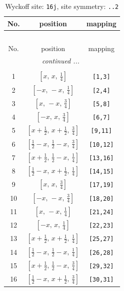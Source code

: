 \documentclass[fleqn,8pt]{jsarticle}
\begin{document}
\renewcommand{\arraystretch}{1.2}
\begin{longtable}{ccc}
\caption{Wyckoff site: {\tt 16j}, site symmetry: {\tt ..2}}
 \\
 \hline \hline
No. & position & mapping \\ \hline \endfirsthead

\multicolumn{2}{l}{\tablename\ \thetable{}} \\
 \hline \hline
No. & position & mapping \\ \hline \endhead

 \hline \hline
\multicolumn{2}{r}{\footnotesize\it continued ...} \\ \endfoot

 \hline \hline
\multicolumn{2}{r}{} \\ \endlastfoot

1 & $\left[ x,\, x,\, \frac{1}{4} \right]$ & {\tt [1,3]} \\ \hline
2 & $\left[ - x,\, - x,\, \frac{1}{4} \right]$ & {\tt [2,4]} \\ \hline
3 & $\left[ x,\, - x,\, \frac{3}{4} \right]$ & {\tt [5,8]} \\ \hline
4 & $\left[ - x,\, x,\, \frac{3}{4} \right]$ & {\tt [6,7]} \\ \hline
5 & $\left[ x + \frac{1}{2},\, x + \frac{1}{2},\, \frac{3}{4} \right]$ & {\tt [9,11]} \\ \hline
6 & $\left[ \frac{1}{2} - x,\, \frac{1}{2} - x,\, \frac{3}{4} \right]$ & {\tt [10,12]} \\ \hline
7 & $\left[ x + \frac{1}{2},\, \frac{1}{2} - x,\, \frac{1}{4} \right]$ & {\tt [13,16]} \\ \hline
8 & $\left[ \frac{1}{2} - x,\, x + \frac{1}{2},\, \frac{1}{4} \right]$ & {\tt [14,15]} \\ \hline
9 & $\left[ x,\, x,\, \frac{3}{4} \right]$ & {\tt [17,19]} \\ \hline
10 & $\left[ - x,\, - x,\, \frac{3}{4} \right]$ & {\tt [18,20]} \\ \hline
11 & $\left[ x,\, - x,\, \frac{1}{4} \right]$ & {\tt [21,24]} \\ \hline
12 & $\left[ - x,\, x,\, \frac{1}{4} \right]$ & {\tt [22,23]} \\ \hline
13 & $\left[ x + \frac{1}{2},\, x + \frac{1}{2},\, \frac{1}{4} \right]$ & {\tt [25,27]} \\ \hline
14 & $\left[ \frac{1}{2} - x,\, \frac{1}{2} - x,\, \frac{1}{4} \right]$ & {\tt [26,28]} \\ \hline
15 & $\left[ x + \frac{1}{2},\, \frac{1}{2} - x,\, \frac{3}{4} \right]$ & {\tt [29,32]} \\ \hline
16 & $\left[ \frac{1}{2} - x,\, x + \frac{1}{2},\, \frac{3}{4} \right]$ & {\tt [30,31]} \\
\end{longtable}
\end{document}
